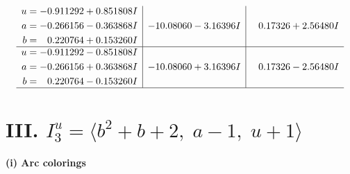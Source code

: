 \documentclass[1p]{elsarticle_modified}
\theoremstyle{definition}
\begin{document}
$$\begin{array}{c|c|c}
\begin{aligned}
u &= -0.911292 + 0.851808 I \\
a &= -0.266156 - 0.363868 I \\
b &= \phantom{-}0.220764 + 0.153260 I\end{aligned}
 & -10.08060 - 3.16396 I & \phantom{-}0.17326 + 2.56480 I \\ \hline\begin{aligned}
u &= -0.911292 - 0.851808 I \\
a &= -0.266156 + 0.363868 I \\
b &= \phantom{-}0.220764 - 0.153260 I\end{aligned}
 & -10.08060 + 3.16396 I & \phantom{-}0.17326 - 2.56480 I\\
 \hline 
 \end{array}$$\newpage\newpage\renewcommand{\arraystretch}{1}
\centering \section*{III. $I^u_{3}= \langle b^2+b+2,\;a-1,\;u+1 \rangle$}
\flushleft \textbf{(i) Arc colorings}\\
\end{document}
